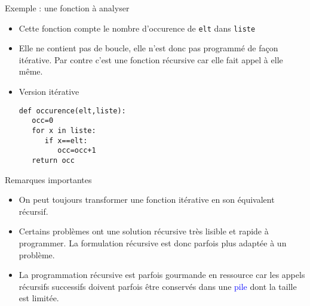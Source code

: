 \documentclass[10pt]{beamer}
\begin{document}
\begin{frame}[fragile]
	\mframe{\Recursivite}
	\begin{exampleblock}{Exemple : une fonction à analyser}
		\begin{itemize}[label=\textbullet]
			\item<2-> \textcolor{OliveGreen}{Cette fonction compte le nombre d'occurence de {\tt elt} dans {\tt liste}}
			\item<3-> \textcolor{OliveGreen}{Elle ne contient pas de boucle, elle n'est donc pas programmé de façon itérative. Par contre c'est une fonction récursive car elle fait appel à elle même.}
			\item<4-> \textcolor{OliveGreen}{Version itérative}
\begin{lstlisting}
def occurence(elt,liste):
   occ=0
   for x in liste:
      if x==elt:
         occ=occ+1
   return occ
\end{lstlisting}
		\end{itemize}
	\end{exampleblock}
\end{frame}

\begin{frame}
	\begin{block}{Remarques importantes}
		\begin{itemize}[label=\textbullet]
			\item<2-> On peut toujours transformer une fonction itérative en son équivalent récursif.
			\item<3-> Certains problèmes ont une solution récursive très lisible et rapide à programmer. La formulation récursive est donc parfois \og plus adaptée \fg à un problème.
			\item<4-> La programmation récursive est parfois gourmande en ressource car les appels récursifs successifs doivent parfois être conservés dans une \textcolor{blue}{pile} dont la taille est limitée.
		\end{itemize}
	\end{block}
\end{frame}
\end{document}
